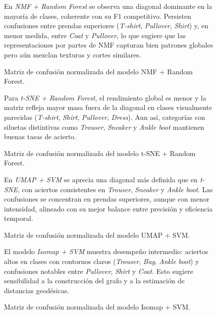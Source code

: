 \documentclass[conference]{IEEEtran}
\begin{document}
\begin{figure}[!htbp]
\centering

\caption{Matriz de confusión normalizada del modelo NMF + Random Forest.}
\label{fig:matriz_confusion_nmf}
\vspace{1.2mm}
\parbox{0.95\columnwidth}{\footnotesize\raggedright En \textit{NMF + Random Forest} se observa una diagonal dominante en la mayoría de clases, coherente con su F1 competitivo. Persisten confusiones entre prendas superiores (\textit{T-shirt}, \textit{Pullover}, \textit{Shirt}) y, en menor medida, entre \textit{Coat} y \textit{Pullover}, lo que sugiere que las representaciones por partes de NMF capturan bien patrones globales pero aún mezclan texturas y cortes similares.}
\end{figure}

\begin{figure}[!htbp]
\centering

\caption{Matriz de confusión normalizada del modelo t-SNE + Random Forest.}
\label{fig:matriz_confusion_tsne_rf}
\vspace{1.2mm}
\parbox{0.95\columnwidth}{\footnotesize\raggedright Para \textit{t-SNE + Random Forest}, el rendimiento global es menor y la matriz refleja mayor masa fuera de la diagonal en clases visualmente parecidas (\textit{T-shirt}, \textit{Shirt}, \textit{Pullover}, \textit{Dress}). Aun así, categorías con siluetas distintivas como \textit{Trouser}, \textit{Sneaker} y \textit{Ankle boot} mantienen buenas tasas de acierto.}
\end{figure}

\begin{figure}[!htbp]
\centering

\caption{Matriz de confusión normalizada del modelo UMAP + SVM.}
\label{fig:matriz_confusion_umap_svm}
\vspace{1.2mm}
\parbox{0.95\columnwidth}{\footnotesize\raggedright En \textit{UMAP + SVM} se aprecia una diagonal más definida que en \textit{t-SNE}, con aciertos consistentes en \textit{Trouser}, \textit{Sneaker} y \textit{Ankle boot}. Las confusiones se concentran en prendas superiores, aunque con menor intensidad, alineado con su mejor balance entre precisión y eficiencia temporal.}
\end{figure}

\begin{figure}[!htbp]
\centering

\caption{Matriz de confusión normalizada del modelo Isomap + SVM.}
\label{fig:matriz_confusion_isomap_svm}
\vspace{1.2mm}
\parbox{0.95\columnwidth}{\footnotesize\raggedright El modelo \textit{Isomap + SVM} muestra desempeño intermedio: aciertos altos en clases con contornos claros (\textit{Trouser}, \textit{Bag}, \textit{Ankle boot}) y confusiones notables entre \textit{Pullover}, \textit{Shirt} y \textit{Coat}. Esto sugiere sensibilidad a la construcción del grafo y a la estimación de distancias geodésicas.}
\end{figure}
\end{document}
